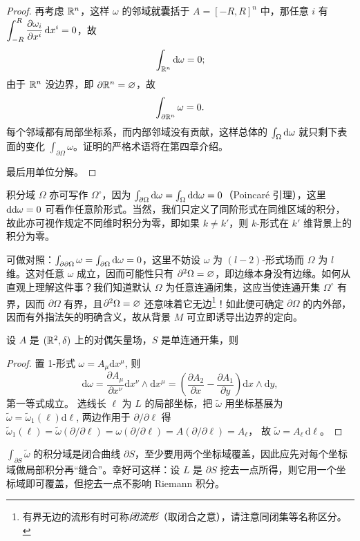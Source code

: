 \begin{proof}
    再考虑 $\mathbb{R}^n$，这样 $\omega$ 的邻域就囊括于 $A=[-R,R]^n$ 中，那任意 $i$ 有 $\displaystyle\int_{-R}^{R}\pdv{\omega_i}{x^i}\dd{x^i}=0$，故
    \[
    \int_{\mathbb{R}^{n}}\dd\omega=0;
    \]
    由于 $\mathbb{R}^n$ 没边界，即 $\partial\mathbb{R}^n=\varnothing$，故
    \[
    \int_{\partial\mathbb{R}^{n}}\omega=0.
    \]
    每个邻域都有局部坐标系，而内部邻域没有贡献，这样总体的 $\int_\Omega\dd\omega$ 就只剩下表面的变化 $\int_{\partial\Omega}\omega$。证明的严格术语将在第四章介绍。

    最后用单位分解。
\end{proof}
积分域 $\Omega$ 亦可写作 $\Omega^\circ$，因为 $\int_{\partial\Omega}\dd\omega=\int_\Omega \dd\dd\omega=0$（Poincaré 引理），这里$\dd\dd\omega=0$ 可看作任意阶形式。当然，我们只定义了同阶形式在同维区域的积分，故此亦可视作规定不同维时积分为零，即如果 $k\neq k'$，则 $k$-形式在 $k'$ 维背景上的积分为零。

可做对照：$\int_{\partial\partial\Omega}\omega=\int_{\partial\Omega} \dd\omega=0$，这里不妨设 $\omega$ 为 $(l-2)$-形式场而 $\Omega$ 为 $l$ 维。这对任意 $\omega$ 成立，因而可能性只有 $\partial^2\Omega=\varnothing$，即边缘本身没有边缘。如何从直观上理解这件事？我们知道默认 $\Omega$ 为任意连通闭集，这应当使连通开集 $\Omega^\circ$ 有界，因而 $\partial\Omega$ 有界，且$\partial^2\Omega=\varnothing$ 还意味着它无边\footnote{有界无边的流形有时可称\textit{闭流形}（取闭合之意），请注意同闭集等名称区分。}！如此便可确定 $\partial\Omega$ 的内外部，因而有外指法矢的明确含义，故从背景 $M$ 可立即诱导出边界的定向。

\begin{example}[Green]
    设 $A$ 是 $(\mathbb{R}^2,\delta)$ 上的对偶矢量场，$S$ 是单连通开集，则
\end{example}
\begin{proof}
    置 1-形式 $\omega=A_\mu\mathrm{d} x^\mu$, 则
\[\mathrm{d} \omega  =\frac{\partial A_\mu}{\partial x^\nu} \mathrm{d} x^\nu \wedge \mathrm{d} x^\mu=\left(\frac{\partial A_2}{\partial x}-\frac{\partial A_1}{\partial y}\right) \mathrm{d} x \wedge \mathrm{d} y,\]
第一等式成立。
选线长 $\ell$ 为 $L$ 的局部坐标，把 $\tilde{\omega}$ 用坐标基展为 $\tilde{\omega}=\tilde{\omega}_1(\ell)\mathrm{d} \ell$, 两边作用于 $\partial / \partial \ell$ 得
$\tilde{\omega}_1(\ell)=\tilde{\omega}(\partial / \partial \ell)=\omega(\partial / \partial \ell)=A(\partial / \partial \ell)=A_\ell$，
故 $\tilde{\omega}=A_\ell\, \mathrm{d} \ell$。
\end{proof}
\begin{remark}
    $\int_{\partial S} \tilde{\omega}$ 的积分域是闭合曲线 $\partial S$，至少要用两个坐标域覆盖，因此应先对每个坐标域做局部积分再“缝合”。幸好可这样：设 $L$ 是 $\partial S$ 挖去一点所得，则它用一个坐标域即可覆盖，但挖去一点不影响 Riemann 积分。
\end{remark}


